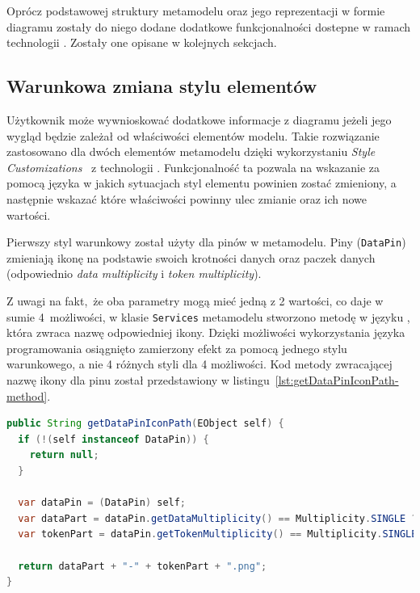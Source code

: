 Oprócz podstawowej struktury metamodelu oraz jego reprezentacji w formie
diagramu zostały do niego dodane dodatkowe funkcjonalności dostepne w ramach
technologii \EMF{}. Zostały one opisane
w kolejnych sekcjach.

\subsection{Warunkowa zmiana stylu elementów}

Użytkownik może wywnioskować dodatkowe informacje z diagramu jeżeli jego wygląd
będzie zależał od właściwości elementów modelu. Takie rozwiązanie zastosowano
dla dwóch elementów metamodelu dzięki wykorzystaniu \emph{Style
	Customizations}~\cite{sirius-desktop-documentation-style-customizations}
z technologii \EMF{}.
Funkcjonalność ta pozwala na wskazanie za pomocą języka \AQL{} w jakich
sytuacjach styl elementu powinien zostać zmieniony, a następnie wskazać które
właściwości powinny ulec zmianie oraz ich nowe wartości.

Pierwszy styl warunkowy został użyty dla pinów w metamodelu. Piny
(\texttt{DataPin}) zmieniają ikonę na podstawie swoich krotności danych oraz
paczek danych (odpowiednio \emph{data multiplicity} i \emph{token
	multiplicity}).

Z uwagi na fakt, że oba parametry mogą mieć jedną z 2 wartości,
co daje w sumie 4~możliwości, w klasie \texttt{Services} metamodelu stworzono
metodę w języku \Java{}, która zwraca nazwę odpowiedniej ikony.
Dzięki możliwości wykorzystania języka programowania osiągnięto
zamierzony efekt za pomocą jednego stylu warunkowego, a nie 4 różnych
styli dla 4 możliwości. Kod metody zwracającej nazwę ikony dla pinu
został przedstawiony w listingu~\ref{lst:getDataPinIconPath-method}.

\begin{lstlisting}[float,
    floatplacement=ht,
    language=Java,
    caption={Metoda zwracająca nazwę ikony dla pinu},
    label={lst:getDataPinIconPath-method}]
public String getDataPinIconPath(EObject self) {
  if (!(self instanceof DataPin)) {
    return null;
  }

  var dataPin = (DataPin) self;
  var dataPart = dataPin.getDataMultiplicity() == Multiplicity.SINGLE ? "single-data" : "multiple-data";
  var tokenPart = dataPin.getTokenMultiplicity() == Multiplicity.SINGLE ? "single-token" : "multiple-tokens";

  return dataPart + "-" + tokenPart + ".png";
}
\end{lstlisting}

